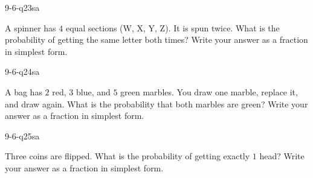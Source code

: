 \begin{practiceQuestion}{9-6-q23}{sa}
\begin{questionText}
A spinner has $4$ equal sections (W, X, Y, Z). It is spun twice. What is the probability of getting the same letter both times? Write your answer as a fraction in simplest form.
\end{questionText}
\end{practiceQuestion}

\begin{practiceQuestion}{9-6-q24}{sa}
\begin{questionText}
A bag has $2$ red, $3$ blue, and $5$ green marbles. You draw one marble, replace it, and draw again. What is the probability that both marbles are green? Write your answer as a fraction in simplest form.
\end{questionText}
\end{practiceQuestion}

\begin{practiceQuestion}{9-6-q25}{sa}
\begin{questionText}
Three coins are flipped. What is the probability of getting exactly $1$ head? Write your answer as a fraction in simplest form.
\end{questionText}
\end{practiceQuestion}


